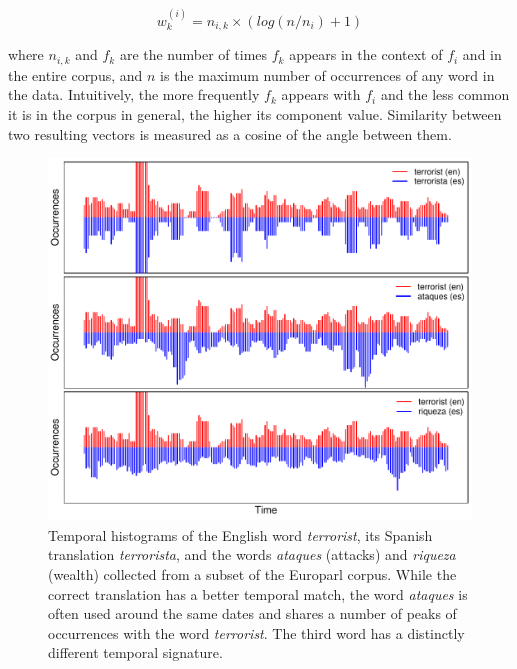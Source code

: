 \documentclass[11pt]{article}
\begin{document}
\begin{equation*}
w_{k}^{(i)} = n_{i,k} \times (log( {n / n_{i}}) + 1)
\end{equation*}

\noindent where $n_{i,k}$ and $f_{k}$ are the number of times $f_{k}$ appears in the context of $f_{i}$ and in the entire corpus, and $n$ is the maximum number of occurrences of any word in the data.  Intuitively, the more frequently $f_{k}$ appears with $f_{i}$ and the less common it is in the corpus in general, the higher its component value.  Similarity between two resulting vectors is measured as a cosine of the angle between them.\\

\begin{figure}[h]
\centerline{\mbox{\includegraphics[width= \columnwidth]{../figures/temporal/temporal}}}
\caption{Temporal histograms of the English word {\em terrorist}, its Spanish translation {\em terrorista}, and the words {\em ataques}  (attacks) and {\em riqueza} (wealth) collected from a subset of the Europarl corpus. While the correct translation has a better temporal match, the word {\em ataques} is often used around the same dates and shares a number of peaks of occurrences with the word {\em terrorist}.  The third word has a distinctly different temporal signature.}
\label{fig:temporal}
\end{figure}
\end{document}
